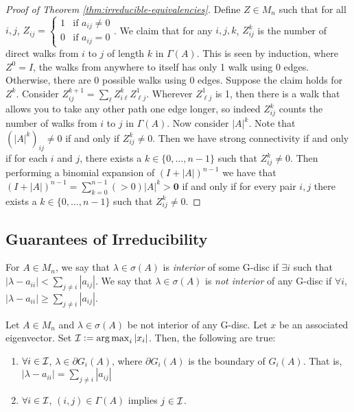\begin{proof}[Proof of Theorem \ref{thm:irreducible-equivalencies}]
Define $Z \in M_n$ such that for all $i,j$, $Z_{ij} = \begin{cases}1 & \text{if } a_{ij} \not=0 \\ 0 & \text{if } a_{ij} = 0\end{cases}$. We claim that for any $i,j,k$, $Z^{k}_{ij}$ is the number of direct walks from $i$ to $j$ of length $k$ in $\Gamma(A)$. This is seen by induction, where $Z^0 = I$, the walks from anywhere to itself has only 1 walk using 0 edges. Otherwise, there are 0 possible walks using 0 edges. Suppose the claim holds for $Z^k$. Consider $Z^{k+1}_{ij} = \sum_{\ell}Z^{k}_{i\ell}Z^{1}_{\ell j}$. Wherever $Z^{1}_{\ell j}$ is 1, then there is a walk that allows you to take any other path one edge longer, so indeed $Z^{k}_{ij}$ counts the number of walks from $i$ to $j$ in $\Gamma(A)$. Now consider $|A|^k$. Note that $(|A|^k)_{ij} \not=0$ if and only if $Z^{k}_{ij} \not= 0$. Then we have strong connectivity if and only if for each $i$ and $j$, there exists a $k \in \{0, \dots, n-1\}$ such that $Z^k_{ij} \not=0$. Then performing a binomial expansion of $(I+|A|)^{n-1}$ we have that $(I+|A|)^{n-1} = \sum_{k=0}^{n-1}(>0)|A|^k > \mathbf{0}$ if and only if for every pair $i,j$ there exists a $k \in \{0, \dots, n-1\}$ such that $Z^k_{ij} \not=0$.
\end{proof}

\subsection{Guarantees of Irreducibility}
\begin{definition}
\label{def:interior-Gerschgorin-disc}
For $A \in M_n$, we say that $\lambda \in \sigma(A)$ is \textit{interior} of some G-disc if $\exists i$ such that $|\lambda - a_{ii}| < \sum_{j\not=i} |a_{ij}|$. We say that $\lambda \in \sigma(A)$ is \textit{not interior} of any G-disc if $\forall i$, $|\lambda-a_{ii}| \ge \sum_{j\not=i}|a_{ij}|$.
\end{definition}

\begin{theorem}
\label{thm:not-interior-argmax}
Let $A \in M_n$ and $\lambda \in \sigma(A)$ be not interior of any G-disc. Let $x$ be an associated eigenvector. Set $\mathcal{I} \vcentcolon= \operatorname*{arg\,max}_i |x_i|$. Then, the following are true:
\begin{enumerate}
    \item $\forall i \in \mathcal{I}$, $\lambda \in \partial G_i(A)$, where $\partial G_i(A)$ is the boundary of $G_i(A)$. That is, $|\lambda-a_{ii}| = \sum_{j\not=i}|a_{ij}|$
    \item $\forall i \in \mathcal{I}$, $(i,j) \in \Gamma(A)$ implies $j \in \mathcal{I}$.
\end{enumerate}
\end{theorem}

